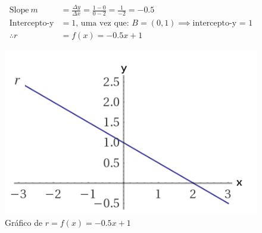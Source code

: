 \documentclass[pdftex, brazil, 12pt, oneside]{article}
\begin{document}
\begin{equation}
  \begin{split}
    \text{Slope}\ m &= \frac{\Delta y}{\Delta x} = \frac{1-0}{0-2} = \frac{1}{-2} = -0.5\\
    \text{Intercepto-y} &= 1\text{, uma vez que: } B=(0,1) \implies \text{intercepto-y = 1}\\
    \therefore r &= f(x) = -0.5x + 1
  \end{split}
\end{equation}

\begin{figure}[H]
  \begin{center}
    \caption{Gráfico de $r = f(x) = -0.5x + 1$}
    \label{fig:reta-r}
    \includegraphics[scale=0.5]{imagens/reta_r.png}
  \end{center}
\end{figure}








\end{document}
